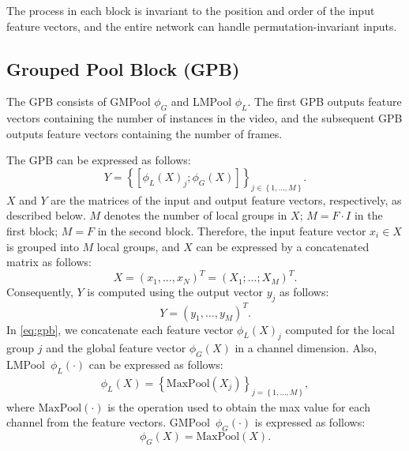 \documentclass[10pt,twocolumn,letterpaper]{article}
\begin{document}
The process in each block is invariant to the position and order of the input feature vectors, and the entire network can handle permutation-invariant inputs.

\subsection{Grouped Pool Block (GPB)}
The GPB consists of GMPool $\phi_G$ and LMPool $\phi_L$.
The first GPB outputs feature vectors containing the number of instances in the video, and the subsequent GPB outputs feature vectors containing the number of frames.

The GPB can be expressed as follows:
\begin{equation}
  Y = \left\{\left[\phi_L\left(X\right)_j; \phi_G\left(X\right)\right]\right\}_{j \in \left\{1,\ldots,M\right\}}.
  \label{eq:gpb}
\end{equation}
$X$ and $Y$ are the matrices of the input and output feature vectors, respectively, as described below.
$M$ denotes the number of local groups in $X$; $M=F \cdot I$ in the first block; $M=F$ in the second block.
Therefore, the input feature vector $x_i \in X$ is grouped into $M$ local groups, and $X$ can be expressed by a concatenated matrix as follows:
\begin{equation}
  X = {\left(x_1,\ldots,x_N\right)}^T = {\left(X_1;\ldots;X_M\right)}^T.
\end{equation}
Consequently, $Y$ is computed using the output vector $y_j$ as follows:
\begin{equation}
Y = {\left(y_1,\ldots,y_M\right)}^T.
\end{equation}
In \cref{eq:gpb}, we concatenate each feature vector $\phi_L\left(X\right)_j$ computed for the local group $j$ and the global feature vector $\phi_G\left(X\right)$ in a channel dimension.
Also, LMPool~$\phi_L(\cdot)$ can be expressed as follows:
\begin{equation}
  \begin{split}
    \phi_L\left(X\right) = \left\{\mathrm{MaxPool}(X_j)\right\}_{j = \left\{1,\ldots,M\right\}},
  \end{split}
\end{equation}
where $\mathrm{MaxPool}(\cdot)$ is the operation used to obtain the max value for each channel from the feature vectors.
GMPool~$\phi_G(\cdot)$ is expressed as follows:
\begin{equation}
  \phi_G(X) = \mathrm{MaxPool}(X).
\end{equation}
\end{document}
